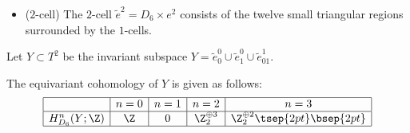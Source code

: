 \begin{itemize}
\item
($2$-cell)
The $2$-cell $\tilde{e}^2 = D_6 \times e^2$ consists of the twelve small triangular regions surrounded by the $1$-cells.
\end{itemize}

Let $Y \subset T^2$ be the invariant subspace $Y = \tilde{e}^0_0 \cup \tilde{e}^0_1 \cup \tilde{e}^1_{01}$.


\begin{lem} \label{lem:p6m_Y}
The equivariant cohomology of $Y$ is given as follows:
$$
\begin{array}{|c|c|c|c|c|}
\hline
 & n = 0 & n = 1 & n = 2 & n = 3 \\
\hline
H^n_{D_6}(Y; \Z) & \Z & 0 & \Z_2^{\oplus 3} & \Z_2^{\oplus 2} \tsep{2pt}\bsep{2pt} \\
\hline
\end{array}
$$
\end{lem}


